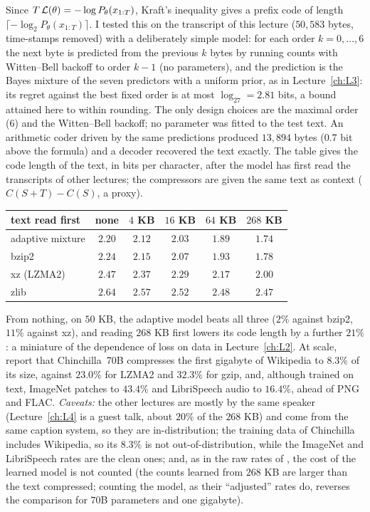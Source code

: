 \begin{beyond}\label{box:L6-compress}
Since $T\,\mathcal{L}(\theta)=-\log P_\theta(x_{1:T})$, Kraft's inequality gives a prefix code of length $\lceil-\log_2P_\theta(x_{1:T})\rceil$. I tested this on the transcript of this lecture ($50{,}583$ bytes, time-stamps removed) with a deliberately simple model: for each order $k=0,\dots,6$ the next byte is predicted from the previous $k$ bytes by running counts with Witten--Bell backoff to order $k-1$ (no parameters), and the prediction is the Bayes mixture of the seven predictors with a uniform prior, as in Lecture~\ref{ch:L3}: its regret against the best fixed order is at most $\log_27=2.81$ bits, a bound attained here to within rounding. The only design choices are the maximal order ($6$) and the Witten--Bell backoff; no parameter was fitted to the test text. An arithmetic coder driven by the same predictions produced $13{,}894$ bytes ($0.7$ bit above the formula) and a decoder recovered the text exactly. The table gives the code length of the text, in bits per character, after the model has first read the transcripts of other lectures; the compressors are given the same text as context ($C(S{+}T)-C(S)$, a proxy).
\begin{center}\small\renewcommand{\arraystretch}{1.1}
\begin{tabular}{@{}lccccc@{}}\toprule
text read first & none & $4$ KB & $16$ KB & $64$ KB & $268$ KB\\\midrule
adaptive mixture & $2.20$ & $2.12$ & $2.03$ & $1.89$ & $1.74$\\
bzip2 & $2.24$ & $2.15$ & $2.07$ & $1.93$ & $1.78$\\
xz (LZMA2) & $2.47$ & $2.37$ & $2.29$ & $2.17$ & $2.00$\\
zlib & $2.64$ & $2.57$ & $2.52$ & $2.48$ & $2.47$\\\bottomrule
\end{tabular}
\end{center}
From nothing, on $50$ KB, the adaptive model beats all three ($2\%$ against bzip2, $11\%$ against xz), and reading $268$ KB first lowers its code length by a further $21\%$: a miniature of the dependence of loss on data in Lecture~\ref{ch:L2}. At scale, \citet{deletang2024} report that Chinchilla~70B compresses the first gigabyte of Wikipedia to $8.3\%$ of its size, against $23.0\%$ for LZMA2 and $32.3\%$ for gzip, and, although trained on text, ImageNet patches to $43.4\%$ and LibriSpeech audio to $16.4\%$, ahead of PNG and FLAC. \emph{Caveats:} the other lectures are mostly by the same speaker (Lecture~\ref{ch:L4} is a guest talk, about $20\%$ of the $268$ KB) and come from the same caption system, so they are in-distribution; the training data of Chinchilla includes Wikipedia, so its $8.3\%$ is not out-of-distribution, while the ImageNet and LibriSpeech rates are the clean ones; and, as in the raw rates of \citet{deletang2024}, the cost of the learned model is not counted (the counts learned from $268$ KB are larger than the text compressed; counting the model, as their ``adjusted'' rates do, reverses the comparison for $70$B parameters and one gigabyte).
\end{beyond}



